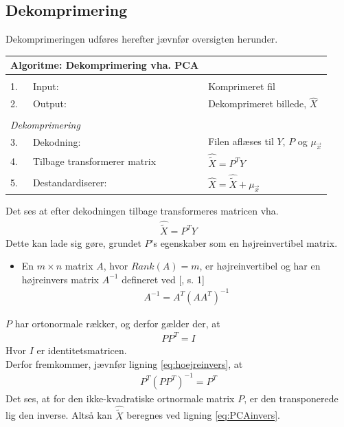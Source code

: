 \subsection*{Dekomprimering}
\label{PCA_dekomprimering}
Dekomprimeringen udføres herefter jævnfør oversigten herunder.
\begin{table}[!h]
\centering
\begin{tabular}{lll}
\hline
\multicolumn{2}{l}{\textbf{Algoritme: Dekomprimering vha. PCA}}    &                                                                   \\ \hline
\\
\multicolumn{1}{|l}{1.}        & Input:                     & Komprimeret fil \\
\multicolumn{1}{|l}{2.}        & Output:                    & Dekomprimeret billede, $\hat{X}$ \\
                               &                            &                                                                   \\
\multicolumn{2}{|l}{\textit{Dekomprimering}}                 &                                                                   \\
\multicolumn{1}{|l}{3.}        & Dekodning:        		 & Filen aflæses til $Y$, $P$ og $\mu_{\vec{x}}$           \\
\multicolumn{1}{|l}{4.}        & Tilbage transformerer matrix & $\hat{\tilde{X}} = P^T Y$           \\
\multicolumn{1}{|l}{5.}        & Destandardiserer:			 & 
$\hat{X} = \hat{\tilde{X}} + \mu_{\vec{x}}$          \\
\end{tabular}
\label{tb:Algoritme-Dekomprimering-PCA}
\end{table}
Det ses at efter dekodningen tilbage transformeres matricen vha.
\begin{align}
\hat{\tilde{X}} = P^T Y
\label{eq:PCAinvers}
\end{align}
Dette kan lade sig gøre, grundet $P$'s egenskaber som en højreinvertibel matrix.
\begin{itemize}
\item[]{En $m \times n$ matrix $A$, hvor $Rank(A)=m$, er højreinvertibel og har en højreinvers matrix $A^{-1}$ defineret ved [\citet{leftinverse}, s. 1]
\begin{align}
A^{-1}=A^T(AA^T)^{-1}
\label{eq:hoejreinvers}
\end{align} 
}
\end{itemize}
$P$ har ortonormale rækker, og derfor gælder der, at
\begin{align}
PP^T=I
\end{align}
Hvor $I$ er identitetsmatricen.\\
Derfor fremkommer, jævnfør ligning \ref{eq:hoejreinvers}, at
\begin{align}
P^T(PP^T)^{-1}=P^T
\end{align}
Det ses, at for den ikke-kvadratiske ortnormale matrix $P$, er den transponerede lig den inverse. Altså kan $\hat{\tilde{X}}$ beregnes ved ligning \ref{eq:PCAinvers}.


